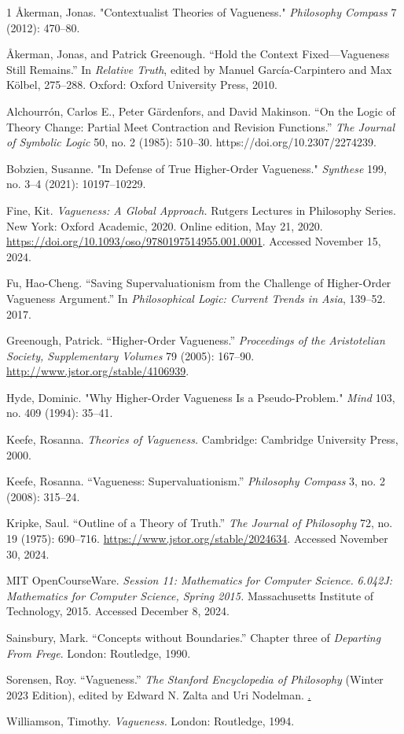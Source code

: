   
\begin{hangparas}{\hangingindent}{1}
Åkerman, Jonas. "Contextualist Theories of Vagueness." \emph{Philosophy
Compass} 7 (2012): 470--80.

Åkerman, Jonas, and Patrick Greenough. ``Hold the Context
Fixed---Vagueness Still Remains.'' In \emph{Relative Truth}, edited by
Manuel García-Carpintero and Max Kölbel, 275--288. Oxford: Oxford
University Press, 2010.

Alchourrón, Carlos E., Peter Gärdenfors, and David Makinson. ``On the
Logic of Theory Change: Partial Meet Contraction and Revision
Functions.'' \emph{The Journal of Symbolic Logic} 50, no. 2 (1985):
510--30. https://doi.org/10.2307/2274239.

Bobzien, Susanne. "In Defense of True Higher-Order Vagueness."
\emph{Synthese} 199, no. 3--4 (2021): 10197--10229.

Fine, Kit. \emph{Vagueness: A Global Approach.} Rutgers Lectures in
Philosophy Series. New York: Oxford Academic, 2020. Online edition, May
21, 2020. \url{https://doi.org/10.1093/oso/9780197514955.001.0001}.
Accessed November 15, 2024.

Fu, Hao-Cheng. ``Saving Supervaluationism from the Challenge of
Higher-Order Vagueness Argument.'' In \emph{Philosophical Logic: Current
Trends in Asia}, 139--52. 2017.

Greenough, Patrick. ``Higher-Order Vagueness.'' \emph{Proceedings of the
Aristotelian Society, Supplementary Volumes} 79 (2005): 167--90.
\url{http://www.jstor.org/stable/4106939}.

Hyde, Dominic. "Why Higher-Order Vagueness Is a Pseudo-Problem."
\emph{Mind} 103, no. 409 (1994): 35--41.

Keefe, Rosanna. \emph{Theories of Vagueness.} Cambridge: Cambridge
University Press, 2000.

Keefe, Rosanna. ``Vagueness: Supervaluationism.'' \emph{Philosophy
Compass} 3, no. 2 (2008): 315--24.

Kripke, Saul. ``Outline of a Theory of Truth.'' \emph{The Journal of
Philosophy} 72, no. 19 (1975): 690--716.
\url{https://www.jstor.org/stable/2024634}. Accessed November 30, 2024.

MIT OpenCourseWare. \emph{Session 11: Mathematics for Computer Science.}
\emph{6.042J: Mathematics for Computer Science, Spring 2015.}
Massachusetts Institute of Technology, 2015. Accessed December 8, 2024.

Sainsbury, Mark. ``Concepts without Boundaries.'' Chapter three of
\emph{Departing From Frege}. London: Routledge, 1990.

Sorensen, Roy. ``Vagueness.'' \emph{The Stanford Encyclopedia of
Philosophy} (Winter 2023 Edition), edited by Edward N. Zalta and Uri
Nodelman.
\href{https://plato.stanford.edu/archives/win2023/entries/vagueness/}.

Williamson, Timothy. \emph{Vagueness.} London: Routledge, 1994.
\end{hangparas}
